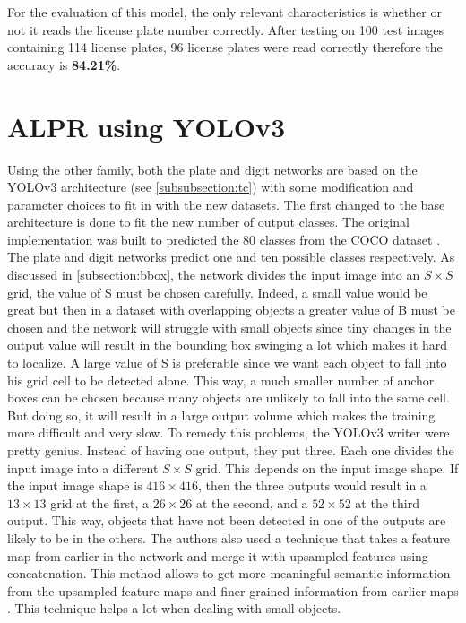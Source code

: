 For the evaluation of this model, the only relevant characteristics is whether or not it reads the license plate number correctly. After testing on 100 test images containing 114 license plates, 96 license plates were read correctly therefore the accuracy is \textbf{84.21\%}.

\section{ALPR using YOLOv3}
Using the other family, both the plate and digit networks are based on the YOLOv3 architecture (see \cref{subsubsection:tc}) with some modification and parameter choices to fit in with
the new datasets. The first changed to the base architecture is done to fit the new number of output classes. The original implementation was built to predicted the 80 classes from the COCO dataset \cite{YOLOv3}. The plate and digit networks predict one and ten possible classes respectively. As discussed in \cref{subsection:bbox}, the network divides the input image into an $S \times S$ grid, the value of S must be chosen carefully. Indeed, a small value would be great but then in a dataset with overlapping objects a greater value of B must be chosen and the network will struggle with small objects since tiny changes in the output value will result in the bounding box swinging a lot which makes it hard to localize. A large value of S is preferable since we want each object to fall into his grid cell to be detected alone. This way, a much smaller number of anchor boxes can be chosen because many objects are unlikely to fall into the same cell. But doing so, it will result in a large output volume which makes the training more difficult and very slow. To remedy this problems, the YOLOv3 writer were pretty genius. Instead of having one output, they put three. Each one divides the input image into a different $S \times S$ grid. This depends on the input image shape. If the input image shape is $416 \times 416$, then the three outputs would result in a $13 \times 13$ grid at the first, a $26 \times 26$ at the second, and a $52 \times 52$ at the third output. This way, objects that have not been detected in one of the outputs are likely to be in the others. The authors also used a technique that takes a feature map from earlier in the network and merge it with upsampled features using concatenation. This method allows to get more meaningful semantic information from the upsampled feature maps and finer-grained information from earlier maps \cite{YOLOv3}. This technique helps a lot when dealing with small objects.

